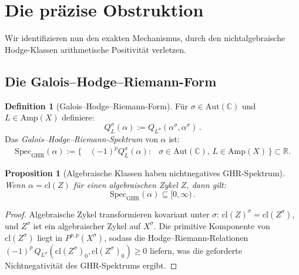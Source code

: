 \documentclass[aps,prd,twocolumn,superscriptaddress,nofootinbib]{revtex4-2}
\newtheorem{proposition}[theorem]{Proposition}
\theoremstyle{definition}
\newtheorem{definition}[theorem]{Definition}
\theoremstyle{remark}
\def\\{ }%
\begin{document}
\section{Die präzise Obstruktion}
\label{sec:obstruction}

Wir identifizieren nun den exakten Mechanismus, durch den nichtalgebraische Hodge-Klassen arithmetische Positivität verletzen.

\subsection{Die Galois--Hodge--Riemann-Form}

\begin{definition}[Galois--Hodge--Riemann-Form]
\label{def:galois_HR}
Für $\sigma \in \mathrm{Aut}(\mathbb{C})$ und $L \in \mathrm{Amp}(X)$ definiere:
\begin{equation}
Q_L^\sigma(\alpha) := Q_{L^\sigma}(\alpha^\sigma, \alpha^\sigma)\,.
\label{eq:galois_HR}
\end{equation}
Das \textit{Galois--Hodge--Riemann-Spektrum} von $\alpha$ ist:
\begin{equation}
\begin{aligned}
\mathrm{Spec}_{\mathrm{GHR}}(\alpha)
:= \{\, &(-1)^p Q_L^\sigma(\alpha) :\\
&\sigma \in \mathrm{Aut}(\mathbb{C}),\,
  L \in \mathrm{Amp}(X)\,\} \subset \mathbb{R}.
\end{aligned}
\end{equation}
\end{definition}

\begin{proposition}[Algebraische Klassen haben nichtnegatives GHR-Spektrum]
\label{prop:ghr_positive}
Wenn $\alpha = \mathrm{cl}(Z)$ für einen algebraischen Zykel $Z$, dann gilt:
\begin{equation}
\mathrm{Spec}_{\mathrm{GHR}}(\alpha) \subseteq [0, \infty)\,.
\end{equation}
\end{proposition}

\begin{proof}
Algebraische Zykel transformieren kovariant unter $\sigma$: $\mathrm{cl}(Z)^\sigma = \mathrm{cl}(Z^\sigma)$, und $Z^\sigma$ ist ein algebraischer Zykel auf $X^\sigma$. Die primitive Komponente von $\mathrm{cl}(Z^\sigma)$ liegt in $P^{p,p}(X^\sigma)$, sodass die Hodge--Riemann-Relationen $(-1)^p\, Q_{L^\sigma}(\mathrm{cl}(Z^\sigma)_0, \mathrm{cl}(Z^\sigma)_0) \geq 0$ liefern, was die geforderte Nichtnegativität des GHR-Spektrums ergibt.
\end{proof}
\end{document}
